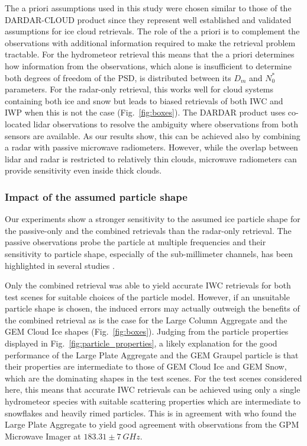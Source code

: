 \documentclass[journal abbreviation, manuscript]{copernicus}
\begin{document}
The a priori assumptions used in this study were chosen similar to those of the
DARDAR-CLOUD product since they represent well established and validated
assumptions for ice cloud retrievals. The role of the a priori is to complement
the observations with additional information required to make the retrieval
problem tractable. For the hydrometeor retrieval this means that the a priori
determines how information from the observations, which alone is insufficient to
determine both degrees of freedom of the PSD, is distributed between its $D_m$
and $N_0^*$ parameters. For the radar-only retrieval, this works well for cloud
systems containing both ice and snow but leads to biased retrievals of both IWC
and IWP when this is not the case (Fig.~\ref{fig:boxes}). The DARDAR product
uses co-located lidar observations to resolve the ambiguity where observations
from both sensors are available. As our results show, this can be achieved also
by combining a radar with passive microwave radiometers. However, while the
overlap between lidar and radar is restricted to relatively thin clouds,
microwave radiometers can provide sensitivity even inside thick clouds.

\subsubsection{Impact of the assumed particle shape}

Our experiments show a stronger sensitivity to the assumed ice particle shape
for the passive-only and the combined retrievals than the radar-only retrieval.
The passive observations probe the particle at multiple frequencies and their
sensitivity to particle shape, especially of the sub-millimeter channels, has
been highlighted in several studies \citep{ekelund20, fox19}.

Only the combined retrieval was able to yield accurate IWC retrievals for both
test scenes for suitable choices of the particle model. However, if an
unsuitable particle shape is chosen, the induced errors may actually outweigh
the benefits of the combined retrieval as is the case for the Large Column
Aggregate and the GEM Cloud Ice shapes (Fig.~\ref{fig:boxes}). Judging from the
particle properties displayed in Fig.~\ref{fig:particle_properties}, a likely
explanation for the good performance of the Large Plate Aggregate and the GEM
Graupel particle is that their properties are intermediate to those of GEM Cloud
Ice and GEM Snow, which are the dominating shapes in the test scenes. For the
test scenes considered here, this means that accurate IWC retrievals can be
achieved using only a single hydrometeor species with suitable scattering
properties which are intermediate to snowflakes and heavily rimed particles.
This is in agreement with \citet{ekelund20} who found the Large Plate Aggregate
 to yield good agreement with observations from the GPM Microwave Imager at
$183.31 \pm 7\ \unit{GHz}$.
\end{document}
